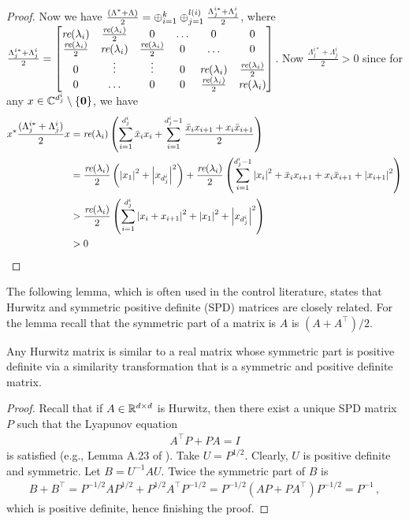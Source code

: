 \begin{proof}
Now we have $\frac{(\Lambda^*+\Lambda)}{2}=\oplus_{i=1}^k \oplus_{j=1}^{l(i)}\frac{\Lambda^{i*}_{j}+\Lambda^i_{j}}{2}$, where $\frac{\Lambda^{i*}_{j}+\Lambda^i_{j}}{2}=\begin{bmatrix} \emph{re}(\lambda_i) &\frac{\emph{re}(\lambda_i)}{2} &0 &\ldots &0 &0\\ \frac{\emph{re}(\lambda_i)}{2} &\emph{re}(\lambda_i) &\frac{\emph{re}(\lambda_i)}{2} &0 &\ldots &0 \\ 0 &\vdots &\vdots &0 &\emph{re}(\lambda_i) &\frac{\emph{re}(\lambda_i)}{2} \\ 0 &\ldots &0 &0 &\frac{\emph{re}(\lambda_i)}{2} &\emph{re}(\lambda_i) \end{bmatrix} $. Now $\frac{\Lambda^{i*}_j+\Lambda^i_j}{2} >0$ since for any $x\in \mathbb{C}^{d_j^i} \setminus\{\mathbf{0}\}$, we have %
\begin{align*}
x^* \frac{(\Lambda^{i*}_j+\Lambda^i_j)}{2} x &=\emph{re}(\lambda_i) \left(\sum_{i=1}^{d^i_j} \bar{x}_i x_i+\sum_{i=1}^{d^i_j-1} \frac{\bar{x}_i x_{i+1} + x_i\bar{x}_{i+1}}{2}\right) \\
&=\frac{\emph{re}(\lambda_i)}{2}\left(\left|x_1\right|^2+ \left|x_{d^i_j}\right|^2\right)+\frac{\emph{re}(\lambda_i)}{2}\left( \sum_{i=1}^{d^i_j-1} \left|x_i\right|^2+\bar{x}_i x_{i+1} + x_i\bar{x}_{i+1}+\left|x_{i+1}\right|^2 \right)\\
&>\frac{\emph{re}(\lambda_i)}{2}\left(\sum_{i=1}^{d^i_j} \left|x_i+x_{i+1}\right|^2 +\left|x_1\right|^2+\left|x_{d^i_j}\right|^2\right) \\
&> 0
\end{align*}
\end{proof}
\fi
The following lemma, which is often used in the control literature, states that Hurwitz and symmetric positive definite (SPD) matrices are closely related. 
For the lemma recall that the symmetric part of a matrix is $A$ is $(A+A^\top)/2$.
\begin{lemma}\label{lm:simtran}
Any Hurwitz matrix is similar to a real matrix whose symmetric part is positive definite
via a similarity transformation that is a symmetric and positive definite matrix.  
\end{lemma}
\begin{proof}
Recall that if $A\in \mathbb{R}^{d\times d}$ is Hurwitz, then there exist a unique SPD matrix $P$ such that the Lyapunov equation
\begin{align*}
A^\top P + P A = I
\end{align*}
is satisfied (e.g., Lemma A.23 of \citet{french2003}).
Take $U = P^{1/2}$. Clearly, $U$ is positive definite and symmetric.
Let $B = U^{-1} A U$. 
Twice the symmetric part of $B$ is 
\begin{align*}
B+B^\top 
 = P^{-1/2} A P^{1/2} + P^{1/2} A^\top P^{-1/2} 
 = P^{-1/2} ( A P +  P A^\top ) P^{-1/2} = P^{-1}\,,
\end{align*}
which is positive definite, hence finishing the proof.
\end{proof}

